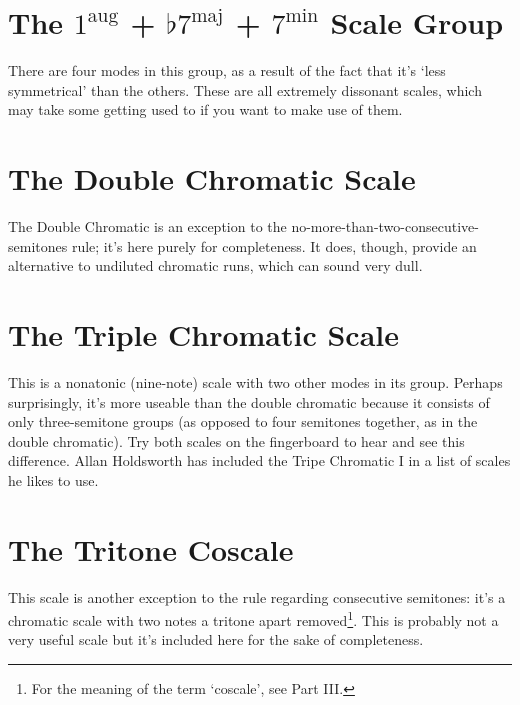 \documentclass[english]{./gbook}
\begin{document}
\begin{large}
\section{The $1^{\text{aug}}$ + $\flat 7^{\text{maj}}$  + $7^{\text{min}}$ Scale Group}

There are four modes in this group, as a result of the fact that it's `less symmetrical' than the others. These are all extremely dissonant scales, which may take some getting used to if you want to make use of them.


\section{The Double Chromatic Scale}
The Double Chromatic is an exception to the no-more-than-two-consecutive-semitones rule; it's here purely for completeness. It does, though, provide an alternative to undiluted chromatic runs, which can sound very dull.

\section{The Triple Chromatic Scale}
This is a nonatonic (nine-note) scale with two other modes in its group. Perhaps surprisingly, it's more useable than the double chromatic because it consists of only three-semitone groups (as opposed to four semitones together, as in the double chromatic). Try both scales on the fingerboard to hear and see this difference. Allan Holdsworth has included the Tripe Chromatic I in a list of scales he likes to use.


\section{The Tritone Coscale}
This scale is another exception to the rule regarding consecutive semitones: it's a chromatic scale with two notes a tritone apart removed\footnote{For the meaning of the term `coscale', see Part III.}. This is probably not a very useful scale but it's included here for the sake of completeness.


\end{large}
\end{document}
